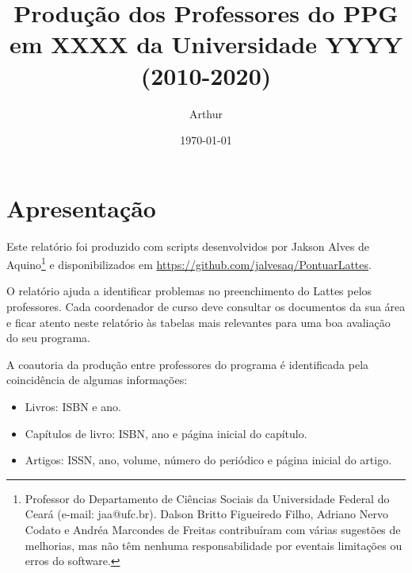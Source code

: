 \documentclass[12pt,brazil]{article}\usepackage[]{graphicx}\usepackage[]{xcolor}
\makeatletter
\newenvironment{kframe}{%
 \def\at@end@of@kframe{}%
 \ifinner\ifhmode%
  \def\at@end@of@kframe{\end{minipage}}%
  \begin{minipage}{\columnwidth}%
 \fi\fi%
 \def\FrameCommand##1{\hskip\@totalleftmargin \hskip-\fboxsep
 \colorbox{shadecolor}{##1}\hskip-\fboxsep
     \hskip-\linewidth \hskip-\@totalleftmargin \hskip\columnwidth}%
 \MakeFramed {\advance\hsize-\width
   \@totalleftmargin\z@ \linewidth\hsize
   \@setminipage}}%
 {\par\unskip\endMakeFramed%
 \at@end@of@kframe}
\newcounter{tabela}
\makeatother
\begin{document}
\begin{kframe}


{\ttfamily\noindent\bfseries\color{errorcolor}{\#\# Error in d[[v]]/d\$ncoaut: argumento não-numérico para operador binário}}\end{kframe}

\title{Produção dos Professores do PPG em XXXX da Universidade YYYY (2010-2020)}
\author{Arthur}
\date{\today}

\maketitle

\tableofcontents

\newpage

\listoftables

\clearpage


\section{Apresentação}

Este relatório foi produzido com scripts desenvolvidos por Jakson Alves de
Aquino\footnote{Professor do Departamento de Ciências Sociais da Universidade
Federal do Ceará (e-mail: jaa@ufc.br). Dalson Britto Figueiredo Filho, Adriano
Nervo Codato e Andréa Marcondes de Freitas contribuíram com várias sugestões
de melhorias, mas não têm nenhuma responsabilidade por eventais limitações ou
erros do software.} e disponibilizados em
\url{https://github.com/jalvesaq/PontuarLattes}.

O relatório ajuda a identificar problemas no preenchimento do Lattes pelos
professores. Cada coordenador de curso deve consultar os documentos
da sua área e ficar atento neste relatório às tabelas mais
relevantes para uma boa avaliação do seu programa.

A coautoria da produção entre professores do programa é identificada pela
coincidência de algumas informações:

\begin{itemize}

    \item Livros: ISBN e ano.

    \item Capítulos de livro: ISBN, ano e página inicial do capítulo.

    \item Artigos: ISSN, ano, volume, número do periódico e página inicial do
        artigo.

\end{itemize}
\end{document}
